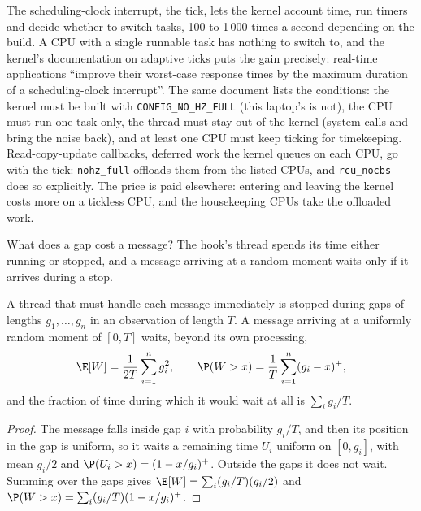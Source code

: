 The scheduling-clock interrupt, the tick, lets the kernel account time, run timers and decide whether to switch tasks,
100 to 1\,000 times a second depending on the build. A CPU with a single runnable task has nothing to switch to, and the
kernel's documentation on adaptive ticks puts the gain precisely: real-time applications ``improve their worst-case response
times by the maximum duration of a scheduling-clock interrupt''. The same document lists the conditions: the kernel must be
built with \texttt{CONFIG\_NO\_HZ\_FULL} (this laptop's is not), the CPU must run one task only, the thread must stay out of
the kernel (system calls and  bring the noise back), and at least one CPU must keep ticking for timekeeping.
Read-copy-update callbacks, deferred work the kernel queues on each CPU, go with the tick: \texttt{nohz\_full} offloads them
from the listed CPUs, and \texttt{rcu\_nocbs} does so explicitly. The price is paid elsewhere: entering and leaving the kernel
costs more on a tickless CPU, and the housekeeping CPUs take the offloaded work.

What does a gap cost a message? The hook's thread spends its time either running or stopped, and a message arriving at a
random moment waits only if it arrives during a stop.

\begin{proposition}\label{prop:ll:linux-tuning:wait}
A thread that must handle each message immediately is stopped during gaps of lengths $g_1,\dots,g_n$ in an observation of
length $T$. A message arriving at a uniformly random moment of $[0,T]$ waits, beyond its own processing,
\[
\E[W] = \frac{1}{2T}\sum_{i=1}^{n} g_i^2, \qquad \P(W > x) = \frac{1}{T}\sum_{i=1}^{n} (g_i - x)^+ ,
\]
and the fraction of time during which it would wait at all is $\sum_i g_i/T$.
\end{proposition}

\begin{proof}
The message falls inside gap $i$ with probability $g_i/T$, and then its position in the gap is uniform, so it waits a
remaining time $U_i$ uniform on $[0, g_i]$, with mean $g_i/2$ and $\P(U_i > x) = (1 - x/g_i)^+$. Outside the gaps it does
not wait. Summing over the gaps gives $\E[W] = \sum_i (g_i/T)(g_i/2)$ and $\P(W > x) = \sum_i (g_i/T)(1 - x/g_i)^+$.
\end{proof}

